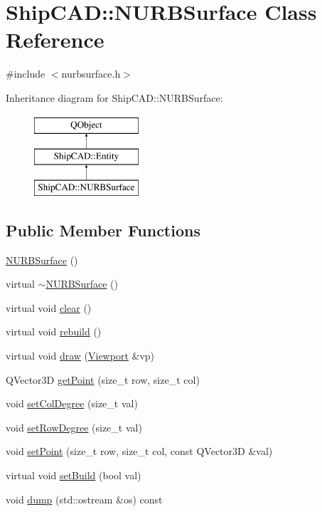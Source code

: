 \hypertarget{classShipCAD_1_1NURBSurface}{\section{Ship\-C\-A\-D\-:\-:N\-U\-R\-B\-Surface Class Reference}
\label{classShipCAD_1_1NURBSurface}
}


{\ttfamily \#include $<$nurbsurface.\-h$>$}

Inheritance diagram for Ship\-C\-A\-D\-:\-:N\-U\-R\-B\-Surface\-:\begin{figure}[H]
\begin{center}
\leavevmode
\includegraphics[height=3.000000cm]{classShipCAD_1_1NURBSurface}
\end{center}
\end{figure}
\subsection*{Public Member Functions}
\begin{DoxyCompactItemize}
\item 
\hyperlink{classShipCAD_1_1NURBSurface_ac01a08234a1d2a5e44d68a7393ef131c}{N\-U\-R\-B\-Surface} ()
\item 
virtual \hyperlink{classShipCAD_1_1NURBSurface_ac15393324ac350b5fd544789f4e55ad0}{$\sim$\-N\-U\-R\-B\-Surface} ()
\item 
virtual void \hyperlink{classShipCAD_1_1NURBSurface_a5013b0c1e511ea68909eef5d0473d032}{clear} ()
\item 
virtual void \hyperlink{classShipCAD_1_1NURBSurface_a643231ea9a8f26e528a1d9a0dccf4070}{rebuild} ()
\item 
virtual void \hyperlink{classShipCAD_1_1NURBSurface_a9ee8f8aea431fe9f465080ec9f5624f9}{draw} (\hyperlink{classShipCAD_1_1Viewport}{Viewport} \&vp)
\item 
Q\-Vector3\-D \hyperlink{classShipCAD_1_1NURBSurface_a30435ae8689f09400b7754e4d7b3242a}{get\-Point} (size\-\_\-t row, size\-\_\-t col)
\item 
void \hyperlink{classShipCAD_1_1NURBSurface_a12217816f19b7de790ae9ed5cc784887}{set\-Col\-Degree} (size\-\_\-t val)
\item 
void \hyperlink{classShipCAD_1_1NURBSurface_a1f71f4cdf57f3f93aeaba0e7705d18f4}{set\-Row\-Degree} (size\-\_\-t val)
\item 
void \hyperlink{classShipCAD_1_1NURBSurface_aca43db0a1f829e101c4df124a4490031}{set\-Point} (size\-\_\-t row, size\-\_\-t col, const Q\-Vector3\-D \&val)
\item 
virtual void \hyperlink{classShipCAD_1_1NURBSurface_aa6fc3d060087593349ce1b5119419433}{set\-Build} (bool val)
\item 
void \hyperlink{classShipCAD_1_1NURBSurface_ad94a4350cda13ed3971ccf7bedaa1f10}{dump} (std\-::ostream \&os) const 
\end{DoxyCompactItemize}
